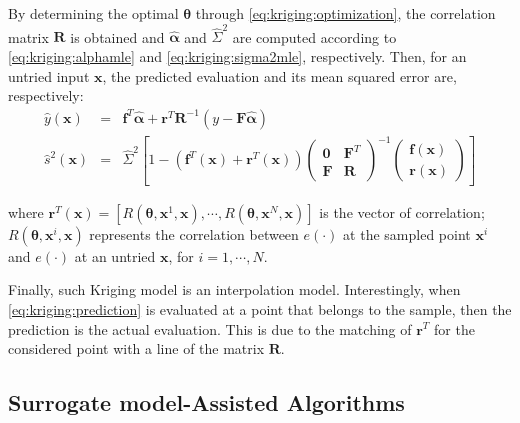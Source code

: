			By determining the optimal $\boldsymbol{\theta}$ through \eqref{eq:kriging:optimization}, the correlation matrix $\mathbf{R}$ is obtained and $\boldsymbol{\hat{\alpha}}$ and $\hat{\Sigma}^2$ are computed according to \eqref{eq:kriging:alphamle} and \eqref{eq:kriging:sigma2mle}, respectively. Then, for an untried input $\mathbf{x}$, the predicted evaluation and its mean squared error are, respectively:
			\begin{eqnarray}
				\hat{y}(\mathbf{x}) &=& \mathbf{f}^T\boldsymbol{\hat{\alpha}} + \mathbf{r}^T\mathbf{R}^{-1}(y-\mathbf{F}\boldsymbol{\hat{\alpha}}) \label{eq:kriging:prediction} \\
				\hat{s}^2(\mathbf{x}) &=& \hat{\Sigma}^2\left[1-\left(\mathbf{f}^T(\mathbf{x})+\mathbf{r}^T(\mathbf{x})\right) \begin{pmatrix} \mathbf{0} & \mathbf{F}^T \\ \mathbf{F} & \mathbf{R} \end{pmatrix}^{-1} \begin{pmatrix} \mathbf{f}(\mathbf{x}) \\ \mathbf{r}(\mathbf{x}) \end{pmatrix} \right]
			\end{eqnarray}
		
			\noindent where $\mathbf{r}^T(\mathbf{x}) = \left[R(\boldsymbol{\theta}, \mathbf{x}^1, \mathbf{x}), \cdots, R(\boldsymbol{\theta}, \mathbf{x}^N, \mathbf{x})\right]$ is the vector of correlation; $R(\boldsymbol{\theta}, \mathbf{x}^i, \mathbf{x})$ represents the correlation between $e(\cdot)$ at the sampled point $\mathbf{x}^i$ and $e(\cdot)$ at an untried $\mathbf{x}$, for $i=1,\cdots,N$. 
			
			Finally, such Kriging model is an interpolation model. Interestingly, when \eqref{eq:kriging:prediction} is evaluated at a point that belongs to the sample, then the prediction is the actual evaluation. This is due to the matching of $\mathbf{r}^T$ for the considered point with a line of the matrix $\mathbf{R}$.

		\subsection{Surrogate model-Assisted Algorithms}\label{chap:proposed-methodology:surrogate:algorithms}
		
